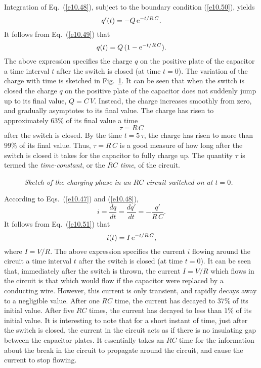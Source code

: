 Integration of Eq.~(\ref{e10.48}), subject to the boundary condition
(\ref{e10.50}), yields
\begin{equation}\label{e10.51}
q'(t) = -Q \,{\rm e}^{-t/R\,C}.
\end{equation}
It follows from Eq.~(\ref{e10.49}) that
\begin{equation}
q(t) = Q\,(1- {\rm e}^{-t/R\,C}).
\end{equation}
The above expression specifies the charge $q$ on the positive plate of
the capacitor a time interval $t$ after the switch is closed
(at time $t=0$). The variation of the charge with time is
sketched in Fig.~\ref{f10.7}. 
It can be seen that when the switch is closed the charge $q$ on the
positive plate of the capacitor
does not suddenly jump up to its final value, $Q=C\,V$. Instead, the charge
increases smoothly from zero, and gradually asymptotes to its final value.
The charge has risen to approximately $63\%$ of its final value a 
time 
\begin{equation}
\tau = R\,C
\end{equation}
after the switch is closed. By the time $t=5\,\tau$, the charge has risen to
more than $99\%$ of its final value. Thus, $\tau=R\,C$ is a good measure of
how long after the
switch is closed it takes for the capacitor to fully charge up.
 The quantity $\tau$ is termed the {\em time-constant},  or the {\em  $RC$ time}, of the circuit.

\begin{figure}
\epsfysize=2in
\centerline{}
\caption{\em Sketch of the charging phase in an $RC$ circuit switched on at $t=0$.}\label{f10.7}
\end{figure}

According to Eqs.~(\ref{e10.47}) and (\ref{e10.48}),
\begin{equation}
i = \frac{dq}{d t} = \frac{dq'}{dt}
= - \frac{q'}{R\,C}.
\end{equation}
It follows from Eq.~(\ref{e10.51}) that
\begin{equation}
i(t) = I\,{\rm e}^{-t/R\,C},
\end{equation}
where $I=V/R$. The above expression specifies the current $i$ flowing
around the circuit a time interval $t$ after the switch is closed
(at time $t=0$). It can be seen that, immediately after the switch is
thrown, the current $I=V/R$ which flows in the circuit is that which would
flow if the capacitor were replaced by a conducting wire. However, this
current is only transient, and rapidly decays away to a negligible value.
After one $RC$ time, the current has decayed to 37\% of its initial value.
After five $RC$ times, the current has decayed to less than 1\% of its initial
value. It is interesting to note that for a short instant of time,
just  after the
switch is closed, the current in the circuit acts as if there is no insulating
gap between the capacitor plates. It essentially takes an $RC$ time for the
information about the break in the
circuit to propagate around the circuit, and cause the current to stop
flowing. 

